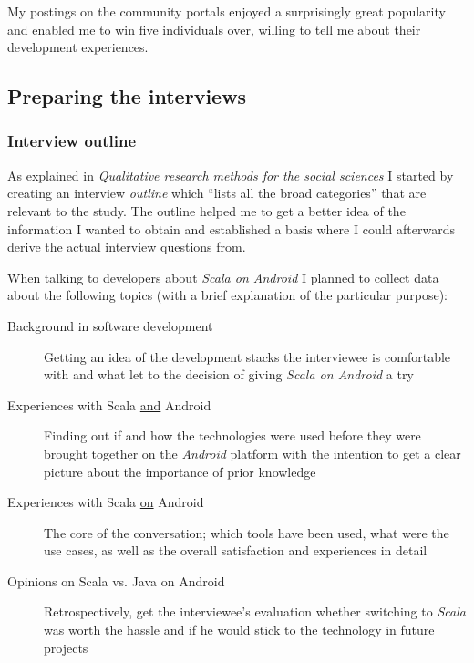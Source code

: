 My postings on the community portals enjoyed a surprisingly great popularity and enabled me to win five individuals over, willing to tell me about their development experiences.

\subsection{Preparing the interviews}

\subsubsection{Interview outline}

As explained in \textit{Qualitative research methods for the social sciences} I started by creating an interview \textit{outline} which \enquote{lists all the broad categories} \cite[p. 72]{berg01} that are relevant to the study. The outline helped me to get a better idea of the information I wanted to obtain and established a basis where I could afterwards derive the actual interview questions from.

When talking to developers about \textit{Scala on Android} I planned to collect data about the following topics (with a brief explanation of the particular purpose):

\begin{description}

	\item[Background in software development]\hfill

	Getting an idea of the development stacks the interviewee is comfortable with and what let to the decision of giving \textit{Scala on Android} a try

	\item[Experiences with Scala \underline{and} Android]\hfill

	Finding out if and how the technologies were used before they were brought together on the \textit{Android} platform with the intention to get a clear picture about the importance of prior knowledge

	\item[Experiences with Scala \underline{on} Android]\hfill

	The core of the conversation; which tools have been used, what were the use cases, as well as the overall satisfaction and experiences in detail

	\item[Opinions on Scala vs. Java on Android]\hfill

	Retrospectively, get the interviewee's evaluation whether switching to \textit{Scala} was worth the hassle and if he would stick to the technology in future projects

\end{description}


